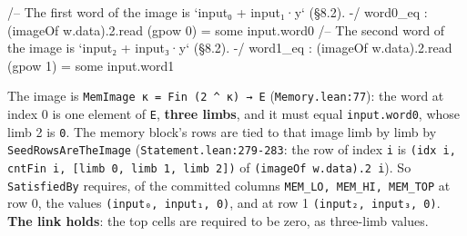 \begin{enumerate}
\begin{leancode}
  /-- The first word of the image is `input₀ + input₁·y` (§8.2). -/
  word0_eq : (imageOf w.data).2.read (gpow 0) = some input.word0
  /-- The second word of the image is `input₂ + input₃·y` (§8.2). -/
  word1_eq : (imageOf w.data).2.read (gpow 1) = some input.word1
\end{leancode}

The image is \texttt{MemImage κ = Fin (\allowbreak{}2 \textasciicircum{} κ) → E} (\texttt{Memory.\allowbreak{}lean:77}): the word at index 0 is one element of \texttt{E}, \textbf{three limbs}, and it must equal \texttt{input.\allowbreak{}word0}, whose limb 2 is \texttt{0}. The memory block's rows are tied to that image limb by limb by \texttt{SeedRowsAreTheImage} (\texttt{Statement.\allowbreak{}lean:279-{}283}: the row of index \texttt{i} is \texttt{(\allowbreak{}i\allowbreak{}d\allowbreak{}x\allowbreak{} i\allowbreak{},\allowbreak{} c\allowbreak{}n\allowbreak{}t\allowbreak{}F\allowbreak{}i\allowbreak{}n\allowbreak{} i\allowbreak{},\allowbreak{} [\allowbreak{}l\allowbreak{}i\allowbreak{}m\allowbreak{}b\allowbreak{} 0\allowbreak{},\allowbreak{} l\allowbreak{}i\allowbreak{}m\allowbreak{}b\allowbreak{} 1\allowbreak{},\allowbreak{} l\allowbreak{}i\allowbreak{}m\allowbreak{}b\allowbreak{} 2\allowbreak{}]\allowbreak{})} of \texttt{(\allowbreak{}imageOf w.\allowbreak{}data).\allowbreak{}2 i}). So \texttt{SatisfiedBy} requires, of the committed columns \texttt{MEM\_\allowbreak{}LO,\allowbreak{} MEM\_\allowbreak{}HI,\allowbreak{} MEM\_\allowbreak{}TOP} at row 0, the values \texttt{(\allowbreak{}input₀,\allowbreak{} input₁,\allowbreak{} 0)}, and at row 1 \texttt{(\allowbreak{}input₂,\allowbreak{} input₃,\allowbreak{} 0)}. \textbf{The link holds}: the top cells are required to be zero, as three-limb values.

\end{enumerate}
